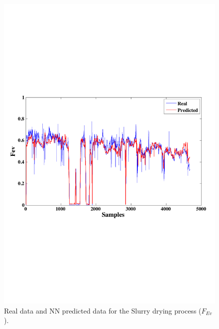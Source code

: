 \begin{figure}
\centering
\includegraphics[width=1\textwidth]{figures/ANN-Evaporator.pdf}
\caption{Real data and NN predicted data for the Slurry drying process ($F_{Ev}$).}
\label{PEvaporator}
\end{figure}
